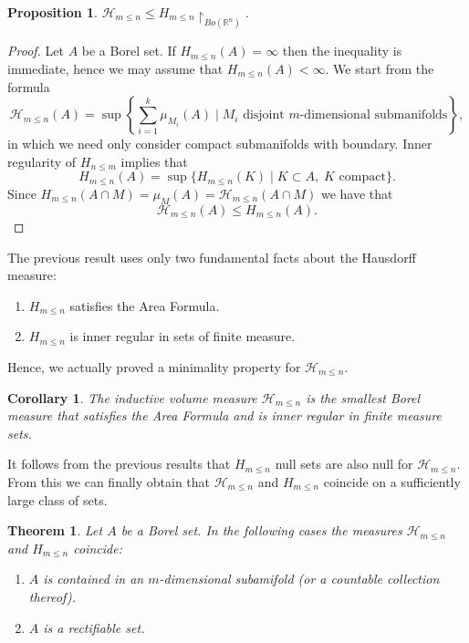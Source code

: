 \documentclass[%
 aip,
 amsmath,amssymb,
 reprint,%
jmp]{revtex4-2}
\newtheorem{theorem}{Theorem}[section]
\newtheorem{corollary}{Corollary}[section]
\newtheorem{proposition}{Proposition}[section]
\begin{document}
\begin{proposition}
$\mathcal{H}_{m\leq n} \leq H_{m\leq n}\restriction_{Bo(\mathbb{R}^{n})}$.
\end{proposition}
\begin{proof}
Let $A$ be a Borel set. If $H_{m\leq n}(A) = \infty$ then the inequality is immediate, hence we may assume that $H_{m\leq n}(A) < \infty$. We start from the formula
\begin{equation*}
    \mathcal{H}_{m\leq n}(A) = \sup\left\{\sum_{i = 1}^{k}\mu_{M_{i}}(A)\;\bigg|\;M_{i}\text{ disjoint $m$-dimensional submanifolds}\right\},
\end{equation*}
in which we need only consider compact submanifolds with boundary. Inner regularity of $H_{n\leq m}$ implies that
\begin{equation*}
    H_{m\leq n}(A) = \sup\{H_{m\leq n}(K)\;|\;K\subset A, \;K\text{ compact}\}.
\end{equation*}
Since $H_{m\leq n}(A\cap M) = \mu_{M}(A) = \mathcal{H}_{m\leq n}(A\cap M)$ we have that
\begin{equation*}
    \mathcal{H}_{m\leq n}(A) \leq H_{m\leq n}(A).
\end{equation*}
\end{proof}

The previous result uses only two fundamental facts about the Hausdorff measure:
\begin{enumerate}
    \item $H_{m\leq n}$ satisfies the Area Formula.
    \item $H_{m\leq n}$ is inner regular in sets of finite measure.
\end{enumerate}
Hence, we actually proved a minimality property for $\mathcal{H}_{m\leq n}$.

\begin{corollary}
The inductive volume measure $\mathcal{H}_{m\leq n}$ is the smallest Borel measure that satisfies the Area Formula and is inner regular in finite measure sets.
\end{corollary}

It follows from the previous results that $H_{m\leq n}$ null sets are also null for $\mathcal{H}_{m\leq n}$. From this we can finally obtain that $\mathcal{H}_{m\leq n}$ and $H_{m\leq n}$ coincide on a sufficiently large class of sets.

\begin{theorem}
Let $A$ be a Borel set. In the following cases the measures $\mathcal{H}_{m\leq n}$ and $H_{m\leq n}$ coincide:
\begin{enumerate}
    \item $A$ is contained in an $m$-dimensional subamifold (or a countable collection thereof).
    \item $A$ is a rectifiable set.
\end{enumerate}
\end{theorem}
\end{document}
